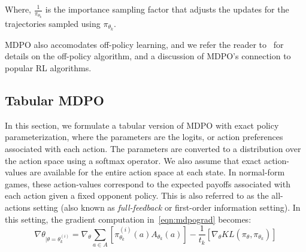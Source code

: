 Where, $\frac{1}{\pi_{\theta_k}}$ is the importance sampling factor that adjusts the updates for
the trajectories sampled using $\pi_{\theta_k}$.

MDPO also accomodates off-policy learning, and we refer the reader to~\cite{tomarMirror2022} for
details on the off-policy algorithm, and a discussion of MDPO's connection to popular RL
algorithms.

\subsection{Tabular MDPO}
In this section, we formulate a tabular version of MDPO with exact policy parameterization, where
the parameters are the logits, or action preferences associated with each action.
The parameters are converted to a distribution over the action space using a softmax operator.
We also assume that exact action-values are available for the entire action space at each state.
In normal-form games, these action-values correspond to the expected payoffs associated with each
action given a fixed opponent policy.
This is also referred to as the all-actions setting (also known as \textit{full-feedback} or
first-order information setting).
In this setting, the gradient computation in~\ref{eqn:mdpograd} becomes: \[ \nabla
	\theta_{|\theta=\theta_{k}^{(i)}} = \nabla_{\theta} \sum_{a \in A} [ \pi_{\theta_k}^{(i)} (a)
		A_{\theta_k}(a)] - \frac{1}{t_k} [\nabla_\theta KL(\pi_\theta, \pi_{\theta_k})] \]

